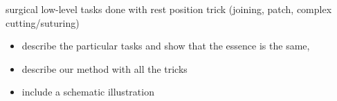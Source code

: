 \noindent surgical low-level tasks done with rest position trick (joining, patch, complex cutting/suturing)
\begin{itemize}
  \item describe the particular tasks and show that the essence is the same,
  \item describe our method with all the tricks
  \item include a schematic illustration
\end{itemize}
